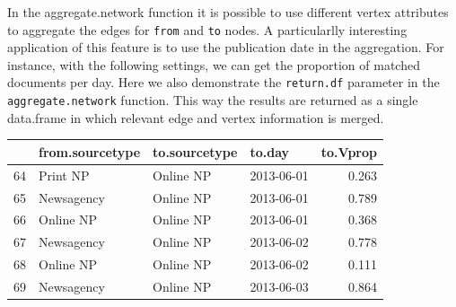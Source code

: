 \documentclass[]{article}
\newenvironment{Shaded}{\begin{snugshade}}{\end{snugshade}}
\newcommand{\KeywordTok}[1]{\textcolor[rgb]{0.13,0.29,0.53}{\textbf{{#1}}}}
\newcommand{\DataTypeTok}[1]{\textcolor[rgb]{0.13,0.29,0.53}{{#1}}}
\newcommand{\StringTok}[1]{\textcolor[rgb]{0.31,0.60,0.02}{{#1}}}
\newcommand{\NormalTok}[1]{{#1}}
\begin{document}
In the aggregate.network function it is possible to use different vertex
attributes to aggregate the edges for \texttt{from} and \texttt{to}
nodes. A particularlly interesting application of this feature is to use
the publication date in the aggregation. For instance, with the
following settings, we can get the proportion of matched documents per
day. Here we also demonstrate the \texttt{return.df} parameter in the
\texttt{aggregate.network} function. This way the results are returned
as a single data.frame in which relevant edge and vertex information is
merged.

\begin{Shaded}
\end{Shaded}

\begin{longtable}[c]{@{}llllr@{}}
\toprule
& from.sourcetype & to.sourcetype & to.day & to.Vprop\tabularnewline
\midrule
\endhead
64 & Print NP & Online NP & 2013-06-01 & 0.263\tabularnewline
65 & Newsagency & Online NP & 2013-06-01 & 0.789\tabularnewline
66 & Online NP & Online NP & 2013-06-01 & 0.368\tabularnewline
67 & Newsagency & Online NP & 2013-06-02 & 0.778\tabularnewline
68 & Online NP & Online NP & 2013-06-02 & 0.111\tabularnewline
69 & Newsagency & Online NP & 2013-06-03 & 0.864\tabularnewline
\bottomrule
\end{longtable}
\end{document}
